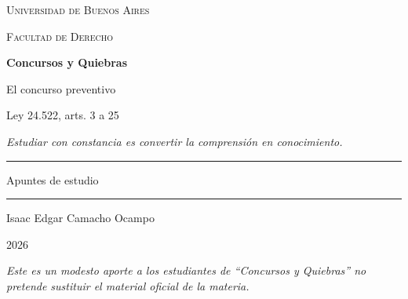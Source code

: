 \documentclass[12pt,oneside]{book}
\newcommand{\universidad}{Universidad de Buenos Aires}
\newcommand{\facultad}{Facultad de Derecho}
\newcommand{\materia}{Concursos y Quiebras}
\newcommand{\titulo}{El concurso preventivo}
\newcommand{\autor}{Isaac Edgar Camacho Ocampo}
\newcommand{\anio}{2026}
\begin{document}
\begin{titlepage}

\thispagestyle{empty}

\begin{center}

\vspace*{1cm}

{\large \textsc{\universidad}}

\vspace{0.2cm}

{\large \textsc{\facultad}}

\vspace{3cm}

{\Huge \textbf{\materia}}

\vspace{1cm}

{\LARGE \titulo}

\vspace{0.3cm}

{\large Ley 24.522, arts. 3 a 25}

\vspace{0.8cm}

\textit{Estudiar con constancia es convertir la comprensión en conocimiento.}

\vspace{1.2cm}

\rule{0.70\textwidth}{0.5pt}

\vspace{0.5cm}

{\large Apuntes de estudio}

\vspace{0.5cm}

\rule{0.70\textwidth}{0.5pt}

\vfill

{\large \autor}

\vspace{0.3cm}

{\large \anio}

\end{center}

\vfill

\begin{flushleft}
\textit{Este es un modesto aporte a los estudiantes de ``Concursos y Quiebras'' no pretende sustituir el material oficial de la materia.}
\end{flushleft}

\end{titlepage}
\end{document}
